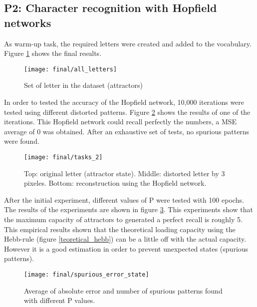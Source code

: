 \subsection{P2: Character recognition with Hopfield networks}
As warm-up task, the required letters were created and added to the vocabulary. Figure \ref{all_letter} shows the final results.

\begin{figure}[!htbp]
\caption{Set of letter in the dataset (attractors)}
\label{all_letter}
\medbreak
\texttt{[image: final/all\_letters]}
\centering
\end{figure}

In order to tested the accuracy of the Hopfield network, 10,000 iterations were tested using different distorted patterns. Figure \ref{final_3_1} shows the results of one of the iterations. This Hopfield network could recall perfectly the numbers, a MSE average of 0 was obtained. After an exhaustive set of tests, no spurious patterns were found. 
\bigbreak
\begin{figure}[!htbp]
\caption{Top: original letter (attractor state). Middle: distorted letter by 3 pixeles. Bottom: reconstruction using the Hopfield network.}
\label{final_3_1}
\medbreak
\texttt{[image: final/tasks\_2]}
\centering
\end{figure}

After the initial experiment, different values of P were tested with 100 epochs. The results of the experiments are shown in figure \ref{spurious_error_state}. This experiments show that the maximum capacity of attractors to generated a perfect recall is roughly 5. This empirical results shown that the theoretical loading capacity using the Hebb-rule (figure \ref{teoretical_hebb}) can be a little off with the actual capacity. However it is a good estimation in order to prevent unexpected states (spurious patterns).
\bigbreak

\begin{figure}[!htbp]
\caption{Average of absolute error and number of spurious patterns found with different P values.}
\label{spurious_error_state}
\medbreak
\texttt{[image: final/spurious\_error\_state]}
\centering
\end{figure}

